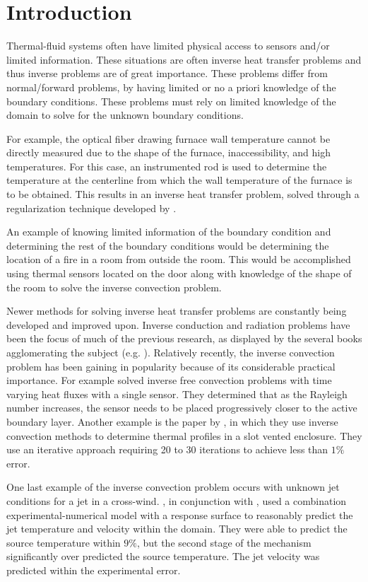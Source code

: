 \documentclass[preprint,12pt]{elsarticle}
\begin{document}
\section{Introduction}

Thermal-fluid systems often have limited physical access to sensors and/or limited information.  These situations are often inverse heat transfer problems and thus inverse problems are of great importance.  These problems differ from normal/forward problems, by having limited or no a priori knowledge of the boundary conditions.  These problems must rely on limited knowledge of the domain to solve for the unknown boundary conditions.

For example, the optical fiber drawing furnace wall temperature cannot be directly measured due to the shape of the furnace, inaccessibility, and high temperatures.  For this case, an instrumented rod is used to determine the temperature at the centerline from which the wall temperature of the furnace is to be obtained.  This results in an inverse heat transfer problem, solved through a regularization technique developed by \citet{issa}.

An example of knowing limited information of the boundary condition and determining the rest of the boundary conditions would be determining the location of a fire in a room from outside the room.  This would be accomplished using thermal sensors located on the door along with knowledge of the shape of the room to solve the inverse convection problem.

Newer methods for solving inverse heat transfer problems are constantly being developed and improved upon.  Inverse conduction and radiation problems have been the focus of much of the previous research, as displayed by the several books agglomerating the subject (e.g. \cite{orlande,ozisik}).  Relatively recently, the inverse convection problem has been gaining in popularity because of its considerable practical importance.  For example \citet{inversecgm} solved inverse free convection problems with time varying heat fluxes with a single sensor.  They determined that as the Rayleigh number increases, the sensor needs to be placed progressively closer to the active boundary layer.  Another example is the paper by \citet{liu}, in which they use inverse convection methods to determine thermal profiles in a slot vented enclosure.  They use an iterative approach requiring 20 to 30 iterations to achieve less than $1\%$ error.

One last example of the inverse convection problem occurs with unknown jet conditions for a jet in a cross-wind.  , in conjunction with \citet{rossmann}, used a combination experimental-numerical model with a response surface to reasonably predict the jet temperature and velocity within the domain.  They were able to predict the source temperature within $9\%$, but the second stage of the mechanism significantly over predicted the source temperature.  The jet velocity was predicted within the experimental error.
\end{document}
